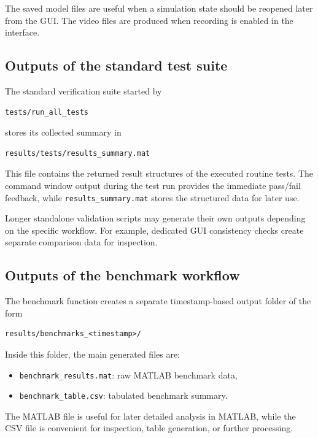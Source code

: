 The saved model files are useful when a simulation state should be reopened later from the GUI. The video files are produced when recording is enabled in the interface.

\subsection*{Outputs of the standard test suite}

The standard verification suite started by

\begin{verbatim}
tests/run_all_tests
\end{verbatim}

stores its collected summary in

\begin{verbatim}
results/tests/results_summary.mat
\end{verbatim}

This file contains the returned result structures of the executed routine tests. The command window output during the test run provides the immediate pass/fail feedback, while \texttt{results\_summary.mat} stores the structured data for later use.

Longer standalone validation scripts may generate their own outputs depending on the specific workflow. For example, dedicated GUI consistency checks create separate comparison data for inspection.

\subsection*{Outputs of the benchmark workflow}

The benchmark function creates a separate timestamp-based output folder of the form

\begin{verbatim}
results/benchmarks_<timestamp>/
\end{verbatim}

Inside this folder, the main generated files are:

\begin{itemize}
    \item \texttt{benchmark\_results.mat}: raw MATLAB benchmark data,
    \item \texttt{benchmark\_table.csv}: tabulated benchmark summary.
\end{itemize}

The MATLAB file is useful for later detailed analysis in MATLAB, while the CSV file is convenient for inspection, table generation, or further processing.


